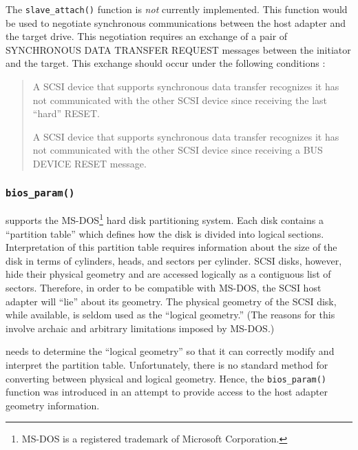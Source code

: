 The {\tt slave\_attach()} function is {\em not\/} currently implemented.
This function would be used to negotiate synchronous communications between
the host adapter and the target drive.  This negotiation requires an
exchange of a pair of SYNCHRONOUS DATA TRANSFER REQUEST messages between
the initiator and the target.  This exchange should occur under the
following conditions \cite{lxt.manual}:
\begin{singlespace}
  \begin{quotation}
    A SCSI device that supports synchronous data transfer recognizes it has
    not communicated with the other SCSI device since receiving the last
    ``hard'' RESET\@.

    A SCSI device that supports synchronous data transfer recognizes it has
    not communicated with the other SCSI device since receiving a BUS
    DEVICE RESET message.
  \end{quotation}
\end{singlespace}




\subsubsection{{\tt bios\_param()}}

\Linux{} supports the MS-DOS\footnote{MS-DOS is a registered trademark of
  Microsoft Corporation.} hard disk partitioning system.  Each disk
contains a ``partition table'' which defines how the disk is divided into
logical sections.  Interpretation of this partition table requires
information about the size of the disk in terms of cylinders, heads, and
sectors per cylinder.  SCSI disks, however, hide their physical geometry
and are accessed logically as a contiguous list of sectors.  Therefore, in
order to be compatible with MS-DOS, the SCSI host adapter will ``lie''
about its geometry.  The physical geometry of the SCSI disk, while
available, is seldom used as the ``logical geometry.''  (The reasons for
this involve archaic and arbitrary limitations imposed by MS-DOS\@.)

\Linux{} needs to determine the ``logical geometry'' so that it can
correctly modify and interpret the partition table.  Unfortunately, there
is no standard method for converting between physical and logical geometry.
Hence, the {\tt bios\_param()} function was introduced in an attempt to
provide access to the host adapter geometry information.

